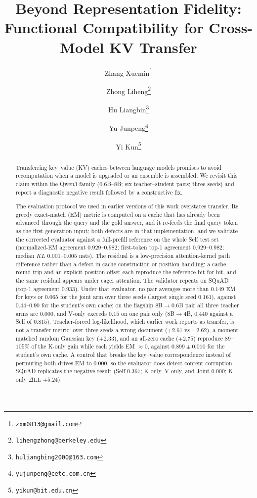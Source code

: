 \documentclass[11pt]{article}
\title{Beyond Representation Fidelity: \\
Functional Compatibility for Cross-Model KV Transfer}
\author{%
  Zhang Xuemin\thanks{\texttt{zxm0813@gmail.com}}
  \and Zhong Liheng\thanks{\texttt{lihengzhong@berkeley.edu}}
  \and Hu Liangbin\thanks{\texttt{huliangbing2000@163.com}}
  \and Yu Junpeng\thanks{\texttt{yujunpeng@cetc.com.cn}}
  \and Yi Kun\thanks{\texttt{yikun@bit.edu.cn}}%
}
\date{}
\newcommand{\dll}{\Delta\text{LL}}
\begin{document}
\maketitle

\begin{abstract}
Transferring key--value (KV) caches between language models promises to avoid
recomputation when a model is upgraded or an ensemble is assembled. We revisit
this claim within the Qwen3 family ($0.6$B--$8$B; six teacher--student pairs;
three seeds) and report a diagnostic negative result followed by a constructive
fix.

The evaluation protocol we used in earlier versions of this work overstates
transfer. Its greedy exact-match (EM) metric is computed on a cache that has
already been advanced through the query and the gold answer, and it re-feeds the
final query token as the first generation input; both defects are in that
implementation, and we validate the corrected evaluator against a full-prefill
reference on the whole Self test set (normalized-EM agreement
$0.929$--$0.982$; first-token top-1 agreement $0.929$--$0.982$; median $KL$
$0.001$--$0.005$ nats). The residual is a low-precision attention-kernel path
difference rather than a defect in cache construction or position handling: a
cache round-trip and an explicit position offset each reproduce the reference
bit for bit, and the same residual appears under eager attention. The validator
repeats on SQuAD (top-1 agreement $0.933$). Under that evaluator, no pair
averages more than $0.149$ EM for keys or
$0.065$ for the joint arm over three seeds (largest single seed $0.161$),
against
$0.44$--$0.90$ for the student's own cache; on the flagship $8$B$\to0.6$B pair
all three teacher arms are $0.000$, and V-only exceeds $0.15$ on one pair only
($8$B$\to4$B, $0.440$ against a Self of $0.815$). Teacher-forced
log-likelihood, which earlier work reports as transfer, is not a transfer
metric: over three seeds a wrong document ($+2.61$ vs $+2.62$), a
moment-matched random Gaussian key ($+2.33$), and an all-zero cache ($+2.75$)
reproduce $89$--$105\%$ of the K-only gain while each yields EM $\approx 0$,
against $0.899\pm0.010$ for the student's own cache. A control that breaks the
key--value correspondence instead of permuting both drives EM to $0.000$, so the
evaluator does detect content corruption. SQuAD replicates
the negative result (Self $0.367$; K-only, V-only, and Joint $0.000$; K-only
$\dll$ $+5.24$).


\end{abstract}
\end{document}
